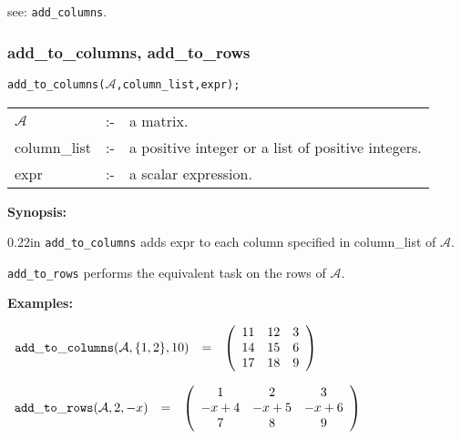 \hspace*{0.175in} see: {\tt add\_columns}.


\subsubsection{add\_to\_columns, add\_to\_rows}
\label{linalg:add_to_columns}


\hspace*{0.175in} {\tt add\_to\_columns($\mathcal{A}$,column\_list,expr);}

\hspace*{0.1in}
\begin{tabular}{l l l}
$\mathcal{A}$   &:-& a matrix. \\
column\_list &:-& a positive integer or a list of positive integers. \\
expr        &:-& a scalar expression.
\end{tabular}

{\bf Synopsis:} %

\begin{addtolength}{\leftskip}{0.22in}
{\tt add\_to\_columns} adds expr to each column specified in 
column\_list of $\mathcal{A}$.  

{\tt add\_to\_rows} performs the equivalent task on the rows of 
$\mathcal{A}$.

\end{addtolength}

{\bf Examples:}

\begin{flushleft}  
\hspace*{0.175in}
\begin{math}
\begin{array}{ccc}
{\tt add\_to\_columns}(\mathcal{A},\{1,2\},10) & = & 
\left( \begin{array}{ccc} 11 & 12 & 3 \\ 14 & 15 & 6 \\ 17 & 18 & 9 
\end{array} \right)  
\end{array}
\end{math}
\end{flushleft}

\vspace*{0.1in}

\begin{flushleft}  
\hspace*{0.175in}
\begin{math}
\begin{array}{ccc}
{\tt add\_to\_rows}(\mathcal{A},2,-x) & = & 
\left( \begin{array}{ccc} 1 & 2 & 3 \\ -x+4 & -x+5 & -x+6 \\ 7 & 8 & 9 
\end{array} \right)  
\end{array}
\end{math}
\end{flushleft}

